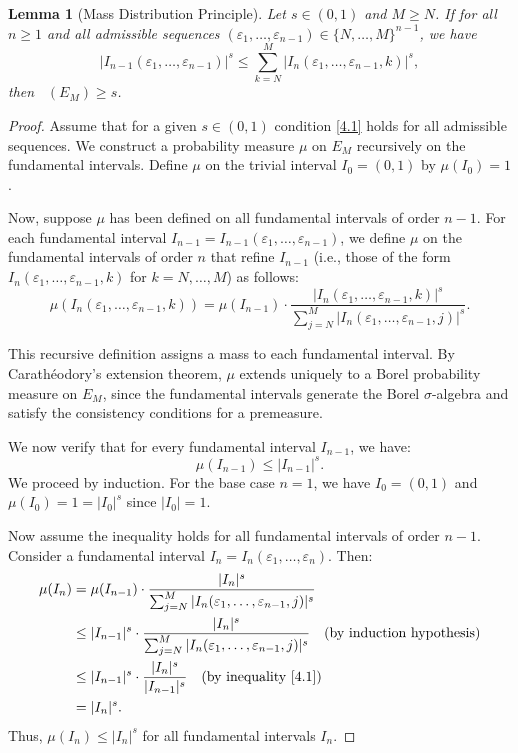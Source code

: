 \documentclass[12pt]{article}
\newtheorem{lemma}[theorem]{Lemma}
\numberwithin{equation}{section}
\DeclareMathOperator{\dimH}{dim_H}
\begin{document}
\begin{lemma}[Mass Distribution Principle] \label{lem:mass-distribution}
Let $s \in (0,1)$ and $M \geq N$. If for all $n \geq 1$ and all admissible sequences $(\varepsilon_1, \ldots, \varepsilon_{n-1}) \in \{N, \ldots, M\}^{n-1}$, we have
\begin{equation}
|I_{n-1}(\varepsilon_1, \ldots, \varepsilon_{n-1})|^s \leq \sum_{k=N}^{M} |I_n(\varepsilon_1, \ldots, \varepsilon_{n-1}, k)|^s, \label{4.1}
\end{equation}
then $\dimH(E_M) \geq s$.
\end{lemma}

\begin{proof}
{Assume that for a given \(s \in (0,1)\) condition \eqref{4.1} holds for all admissible sequences.}
We construct a probability measure $\mu$ on $E_M$ recursively on the fundamental intervals. Define $\mu$ on the trivial interval $I_0 = (0,1)$ by $\mu(I_0) = 1$. 

Now, suppose $\mu$ has been defined on all fundamental intervals of order $n-1$. For each fundamental interval $I_{n-1} = I_{n-1}(\varepsilon_1, \ldots, \varepsilon_{n-1})$, we define $\mu$ on the fundamental intervals of order $n$ that refine $I_{n-1}$ (i.e., those of the form $I_n(\varepsilon_1, \ldots, \varepsilon_{n-1}, k)$ for $k = N, \ldots, M$) as follows:
\[
\mu(I_n(\varepsilon_1, \ldots, \varepsilon_{n-1}, k)) = \mu(I_{n-1}) \cdot \frac{|I_n(\varepsilon_1, \ldots, \varepsilon_{n-1}, k)|^s}{\sum_{j=N}^{M} |I_n(\varepsilon_1, \ldots, \varepsilon_{n-1}, j)|^s}.
\]

This recursive definition assigns a mass to each fundamental interval. By Carathéodory's extension theorem, $\mu$ extends uniquely to a Borel probability measure on $E_M$, since the fundamental intervals generate the Borel $\sigma$-algebra and satisfy the consistency conditions for a premeasure.

We now verify that for every fundamental interval $I_{n-1}$, we have:
\begin{equation}\label{4.2'}
\mu(I_{n-1}) \leq |I_{n-1}|^s.
\end{equation}
We proceed by induction. For the base case $n=1$, we have $I_0 = (0,1)$ and $\mu(I_0) = 1 = |I_0|^s$ since $|I_0| = 1$. 

Now assume the inequality holds for all fundamental intervals of order $n-1$. Consider a fundamental interval $I_n = I_n(\varepsilon_1, \ldots, \varepsilon_n)$. Then:
\begin{align*}
\mu(I_n) &= \mu(I_{n-1}) \cdot \frac{|I_n|^s}{\sum_{j=N}^{M} |I_n(\varepsilon_1, \ldots, \varepsilon_{n-1}, j)|^s} \\
&\leq |I_{n-1}|^s \cdot \frac{|I_n|^s}{\sum_{j=N}^{M} |I_n(\varepsilon_1, \ldots, \varepsilon_{n-1}, j)|^s} \quad \text{(by induction hypothesis)} \\
&\leq |I_{n-1}|^s \cdot \frac{|I_n|^s}{|I_{n-1}|^s} \quad \text{(by inequality \eqref{4.1})} \\
&= |I_n|^s.
\end{align*}
Thus, $\mu(I_n) \leq |I_n|^s$ for all fundamental intervals $I_n$.


\end{proof}
\end{document}

